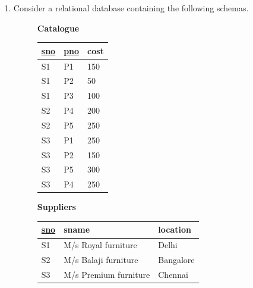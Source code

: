 \documentclass[journal,12pt,onecolumn]{IEEEtran}
\theoremstyle{remark}
\begin{document}
\begin{enumerate}
	\item Consider a relational database containing the following schemas.
	\begin{figure}[H]
		\centering
		\begin{minipage}{0.45\linewidth}
			\centering
			\textbf{Catalogue}
			\begin{tabular}{|l|l|l|}
				\hline
				\underline{sno} & \underline{pno} & cost \\ \hline
				S1 & P1 & 150 \\
				S1 & P2 & 50 \\
				S1 & P3 & 100 \\
				S2 & P4 & 200 \\
				S2 & P5 & 250 \\
				S3 & P1 & 250 \\
				S3 & P2 & 150 \\
				S3 & P5 & 300 \\
				S3 & P4 & 250 \\ \hline
			\end{tabular}
		\end{minipage}
		\begin{minipage}{0.45\linewidth}
			\centering
			\textbf{Suppliers}
			\begin{tabular}{|l|l|l|}
				\hline
				\underline{sno} & sname & location \\ \hline
				S1 & M/s Royal furniture & Delhi \\
				S2 & M/s Balaji furniture & Bangalore \\
				S3 & M/s Premium furniture & Chennai \\ \hline
			\end{tabular}
			\vspace{1cm} %
			

\end{minipage}
\end{figure}
\end{enumerate}
\end{document}
